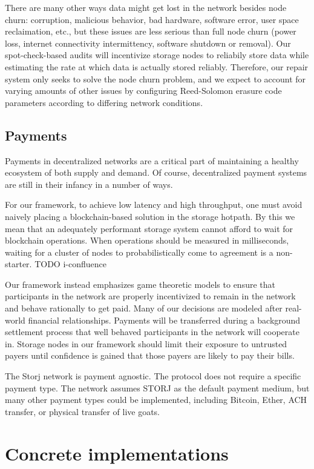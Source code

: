 \documentclass[11pt,fleqn,openany]{book}
\newcommand{\todo}[1]{{\color{red} TODO #1 }}
\begin{document}
There are many other ways data might get lost in the network besides node churn:
corruption, malicious behavior, bad hardware, software error, user space
reclaimation, etc., but these issues are less serious than full node
churn (power loss, internet connectivity intermittency,
software shutdown or removal).
Our spot-check-based audits will incentivize storage nodes to reliabily store
data
while estimating the rate at which data is actually stored reliably.
Therefore, our repair system only seeks to solve the node churn problem, and
we expect to account for varying
amounts of other issues by configuring Reed-Solomon erasure code
parameters according to differing network conditions.

\section{Payments}

Payments in decentralized networks are a critical part of maintaining a healthy
ecosystem of both supply and demand. Of course, decentralized payment systems
are still in their infancy in a number of ways.

For our framework, to achieve low latency and high throughput, one must
avoid naively placing a blockchain-based solution in the storage hotpath.
By this we mean that an adequately performant storage system cannot afford to
wait for blockchain operations. When operations should be measured in
milliseconds, waiting for a cluster of nodes to probabilistically come to
agreement is a non-starter. \todo{i-confluence}

Our framework instead emphasizes game theoretic models to ensure
that participants in the network are properly incentivized to remain in the
network and behave rationally to get paid.
Many of our decisions are modeled after real-world financial relationships.
Payments will be transferred during
a background settlement process that well behaved participants in the network
will cooperate in. Storage nodes in our framework should limit their exposure
to untrusted payers until confidence is gained that those payers are likely
to pay their bills.

The Storj network is payment agnostic.
The protocol does not require a specific payment type.
The network assumes STORJ as the default payment medium, but many other payment
types could be implemented, including Bitcoin, Ether, ACH transfer, or physical
transfer of live goats.

\chapter{Concrete implementations}\label{sec:concrete}
\end{document}
